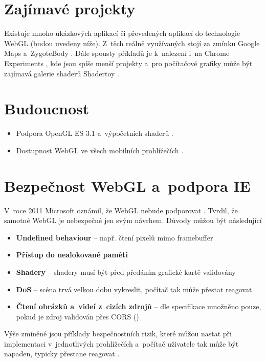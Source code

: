 \documentclass[12pt,a4paper,titlepage,final]{report}
\begin{document}
\section{Zajímavé projekty}
Existuje mnoho ukázkových aplikací či převedených aplikací do technologie WebGL (budou uvedeny níže). Z~těch reálně využívaných stojí za zmínku Google Maps \cite{maps} a~ZygoteBody \cite{zygotebody}. Dále spousty příkladů je k~nalezení i~na Chrome Experiments \cite{chromeexperiments}, kde jsou spíše menší projekty a~pro počítačové grafiky může být zajímavá galerie shaderů Shadertoy \cite{shadertoy}.

\section{Budoucnost}
\begin{itemize}
	\item Podpora OpenGL ES 3.1 a~výpočetních shaderů \cite{future}.
	\item Dostupnost WebGL ve všech mobilních prohlížečích \cite{future}.	
\end{itemize}

\section{Bezpečnost WebGL a~podpora IE}

V~roce 2011 Microsoft oznámil, že WebGL nebude podporovat \cite{arstechnica}. Tvrdil, že samotné WebGL je nebezpečné jen svým návrhem. Důvody můžou být následující

\begin{itemize}
	\item \textbf{Undefined behaviour} -- např. čtení pixelů mimo framebuffer
	\item \textbf{Přístup do nealokované paměti}
	\item \textbf{Shadery} -- shadery musí být před předáním grafické kartě validovány
	\item \textbf{DoS} -- scéna trvá velkou dobu vykreslit, počítač tak může přestat reagovat
	\item \textbf{Čtení obrázků a~videí z~cizích zdrojů} -- dle specifikace umožněno pouze, pokud je zdroj validován přes CORS (\cite{cors})
\end{itemize}

Výše zmíněné jsou příklady bezpečnostních rizik, které můžou nastat při implementaci v~jednotlivých prohlížečích a~počítač uživatele tak může být napaden, typicky přestane reagovat \cite{security}.
\end{document}
